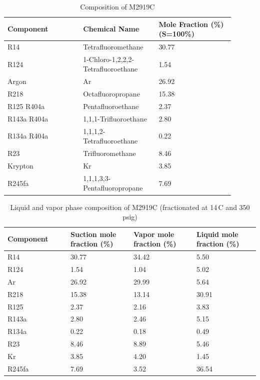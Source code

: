 \begin{table}[htbp]
\centering
\caption{Composition of M2919C}\label{Table 1.5.1}
\begin{tabular}{|p{0.3\linewidth}|p{0.3\linewidth}|p{0.3\linewidth}|}
\hline
Component & Chemical Name & Mole Fraction (\%) (S=100\%) \\
\hline
R14 & Tetrafluoromethane & 30.77 \\
\hline
R124 & 1-Chloro-1,2,2,2-Tetrafluoroethane & 1.54 \\
\hline
Argon & Ar & 26.92 \\
\hline
R218 & Octafluoropropane & 15.38 \\
\hline
R125 R404a & Pentafluoroethane & 2.37 \\
\hline
R143a R404a & 1,1,1-Trifluoroethane & 2.80 \\
\hline
R134a R404a & 1,1,1,2-Tetrafluoroethane & 0.22 \\
\hline
R23 & Trifluoromethane & 8.46 \\
\hline
Krypton & Kr & 3.85 \\
\hline
R245fa & 1,1,1,3,3-Pentafluoropropane & 7.69 \\
\hline
\end{tabular}
\end{table}

\begin{table}[htbp]
\centering
\caption{Liquid and vapor phase composition of M2919C (fractionated at 14\,\degree C and 350 psig)}\label{Table 1.5.2}
\begin{tabular}{|p{0.25\linewidth}|p{0.25\linewidth}|p{0.25\linewidth}|p{0.25\linewidth}|}

\hline
Component & Suction mole fraction (\%) & Vapor mole fraction (\%) & Liquid mole fraction (\%) \\
\hline
R14 & 30.77 & 34.42 & 5.50 \\
\hline
R124 & 1.54 & 1.04 & 5.02 \\
\hline
Ar & 26.92 & 29.99 & 5.64 \\
\hline
R218 & 15.38 & 13.14 & 30.91 \\
\hline
R125 & 2.37 & 2.16 & 3.83 \\
\hline
R143a & 2.80 & 2.46 & 5.15 \\
\hline
R134a & 0.22 & 0.18 & 0.49 \\
\hline
R23 & 8.46 & 8.89 & 5.46 \\
\hline
Kr & 3.85 & 4.20 & 1.45 \\
\hline
R245fa & 7.69 & 3.52 & 36.54 \\
\hline
\end{tabular}
\end{table}

